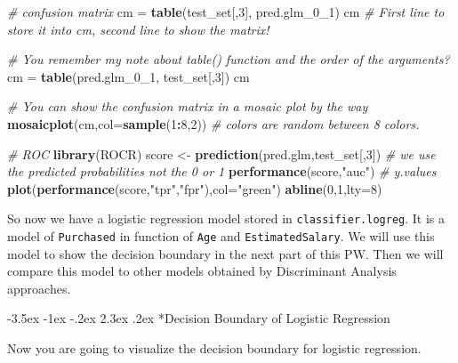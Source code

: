 \documentclass[]{book}
\makeatletter
\newenvironment{Shaded}{\begin{snugshade}}{\end{snugshade}}
\newcommand{\KeywordTok}[1]{\textcolor[rgb]{0.13,0.29,0.53}{\textbf{#1}}}
\newcommand{\DataTypeTok}[1]{\textcolor[rgb]{0.13,0.29,0.53}{#1}}
\newcommand{\DecValTok}[1]{\textcolor[rgb]{0.00,0.00,0.81}{#1}}
\newcommand{\StringTok}[1]{\textcolor[rgb]{0.31,0.60,0.02}{#1}}
\newcommand{\CommentTok}[1]{\textcolor[rgb]{0.56,0.35,0.01}{\textit{#1}}}
\newcommand{\OperatorTok}[1]{\textcolor[rgb]{0.81,0.36,0.00}{\textbf{#1}}}
\newcommand{\NormalTok}[1]{#1}
\renewcommand\section{\@startsection {section}{1}{\z@}%
                                   {-3.5ex \@plus -1ex \@minus -.2ex}%
                                   {2.3ex \@plus.2ex}%
                                   {\normalfont\Large\bfseries\color{ForestGreen}}}
\theoremstyle{definition}
\theoremstyle{definition}
\theoremstyle{definition}
\theoremstyle{remark}
\makeatother
\begin{document}
\begin{Shaded}
\begin{Highlighting}[]
\CommentTok{# confusion matrix}
\NormalTok{cm =}\StringTok{ }\KeywordTok{table}\NormalTok{(test_set[,}\DecValTok{3}\NormalTok{], pred.glm_0_}\DecValTok{1}\NormalTok{)}
\NormalTok{cm}
\CommentTok{# First line to store it into cm, second line to show the matrix! }

\CommentTok{# You remember my note about table() function and the order of the arguments?}
\NormalTok{cm =}\StringTok{ }\KeywordTok{table}\NormalTok{(pred.glm_0_}\DecValTok{1}\NormalTok{, test_set[,}\DecValTok{3}\NormalTok{])}
\NormalTok{cm}

\CommentTok{# You can show the confusion matrix in a mosaic plot by the way}
\KeywordTok{mosaicplot}\NormalTok{(cm,}\DataTypeTok{col=}\KeywordTok{sample}\NormalTok{(}\DecValTok{1}\OperatorTok{:}\DecValTok{8}\NormalTok{,}\DecValTok{2}\NormalTok{)) }\CommentTok{# colors are random between 8 colors.}

\CommentTok{# ROC}
\KeywordTok{library}\NormalTok{(ROCR)}
\NormalTok{score <-}\StringTok{ }\KeywordTok{prediction}\NormalTok{(pred.glm,test_set[,}\DecValTok{3}\NormalTok{]) }\CommentTok{# we use the predicted probabilities not the 0 or 1}
\KeywordTok{performance}\NormalTok{(score,}\StringTok{"auc"}\NormalTok{) }\CommentTok{# y.values}
\KeywordTok{plot}\NormalTok{(}\KeywordTok{performance}\NormalTok{(score,}\StringTok{"tpr"}\NormalTok{,}\StringTok{"fpr"}\NormalTok{),}\DataTypeTok{col=}\StringTok{"green"}\NormalTok{)}
\KeywordTok{abline}\NormalTok{(}\DecValTok{0}\NormalTok{,}\DecValTok{1}\NormalTok{,}\DataTypeTok{lty=}\DecValTok{8}\NormalTok{)}
\end{Highlighting}
\end{Shaded}

So now we have a logistic regression model stored in
\texttt{classifier.logreg}. It is a model of \texttt{Purchased} in
function of \texttt{Age} and \texttt{EstimatedSalary}. We will use this
model to show the decision boundary in the next part of this PW. Then we
will compare this model to other models obtained by Discriminant
Analysis approaches.

\section*{Decision Boundary of Logistic
Regression}\label{decision-boundary-of-logistic-regression}

Now you are going to visualize the decision boundary for logistic
regression.
\end{document}
